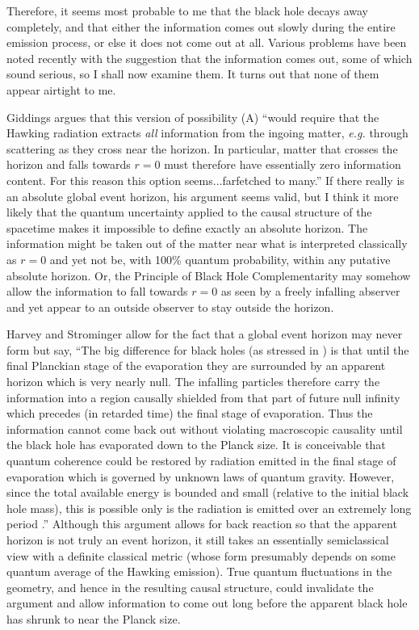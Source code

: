 \documentclass[12pt]{article}
\begin{document}
     Therefore, it seems most probable to me that the black hole
decays away
completely, and that either the information comes out slowly during
the entire
emission process, or else it does not come out at all.  Various
problems have
been noted recently with the suggestion that the information comes
out, some of
which sound serious, so I shall now examine them.  It turns out that
none of
them appear airtight to me.

     Giddings \cite{Gid93} argues that this version of possibility
(A) ``would
require that the Hawking radiation extracts {\it all} information
from the
ingoing matter, {\it e.g.} through scattering as they cross near the
horizon.
In particular, matter that crosses the horizon and falls towards $r =
0$ must
therefore have essentially zero information content.  For this reason
this
option seems...farfetched to many.''  If there really is an absolute
global
event horizon, his argument seems valid, but I think it more likely
that the
quantum uncertainty applied to the causal structure of the spacetime
makes it
impossible to define exactly an absolute horizon.  The information
might be
taken out of the matter near what is interpreted classically as $r =
0$ and yet
not be, with 100\% quantum probability, within any putative absolute
horizon.
Or, the Principle of Black Hole Complementarity \cite{STU,Sus,SusT}
may somehow allow the information to fall towards $r = 0$ as seen by
a freely infalling abserver and yet appear to an outside observer to
stay
outside the horizon.

     Harvey and Strominger \cite{HS} allow for the fact that a global
event
horizon may never form but say, ``The big difference for black holes
(as
stressed in \cite{Wal84}) is that until the final Planckian stage of
the
evaporation they are surrounded by an apparent horizon which is very
nearly
null.  The infalling particles therefore carry the information into a
region
causally shielded from that part of future null infinity which
precedes (in
retarded time) the final stage of evaporation.  Thus the information
cannot
come back out without violating macroscopic causality until the black
hole has
evaporated down to the Planck size.  It is conceivable that quantum
coherence
could be restored by radiation emitted in the final stage of
evaporation which
is governed by unknown laws of quantum gravity.  However, since the
total
available energy is bounded and small (relative to the initial black
hole
mass), this is possible only is the radiation is emitted over an
extremely long
period \cite{ACN}.''  Although this argument allows for back reaction
so that
the apparent horizon is not truly an event horizon, it still takes an
essentially semiclassical view with a definite classical metric
(whose form
presumably depends on some quantum average of the Hawking emission).
True
quantum fluctuations in the geometry, and hence in the resulting
causal
structure, could invalidate the argument and allow information to
come out long
before the apparent black hole has shrunk to near the Planck size.
\end{document}
